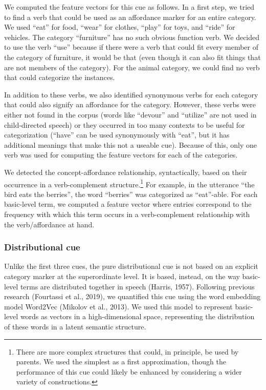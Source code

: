 \documentclass[english,,man,floatsintext]{apa6}
\let\rmarkdownfootnote\footnote%
\def\footnote{\protect\rmarkdownfootnote}
\begin{document}
We computed the feature vectors for this cue as follows. In a first step, we tried to find a verb that could be used as an affordance marker for an entire category. We used \enquote{eat} for food, \enquote{wear} for clothes, \enquote{play} for toys, and \enquote{ride} for vehicles. The category \enquote{furniture} has no such obvious function verb. We decided to use the verb \enquote{use} because if there were a verb that could fit every member of the category of furniture, it would be that (even though it can also fit things that are not members of the category). For the animal category, we could find no verb that could categorize the instances.

In addition to these verbs, we also identified synonymous verbs for each category that could also signify an affordance for the category. However, these verbs were either not found in the corpus (words like \enquote{devour} and \enquote{utilize} are not used in child-directed speech) or they occurred in too many contexts to be useful for categorization (\enquote{have} can be used synonymously with \enquote{eat}, but it has additional meanings that make this not a useable cue). Because of this, only one verb was used for computing the feature vectors for each of the categories.

We detected the concept-affordance relationship, syntactically, based on their occurrence in a verb-complement structure.\footnote{There are more complex structures that could, in principle, be used by parents. We used the simplest as a first approximation, though the performance of this cue could likely be enhanced by considering a wider variety of constructions.} For example, in the utterance \enquote{the bird eats the berries}, the word \enquote{berries} was categorized as \enquote{eat}-able. For each basic-level term, we computed a feature vector where entries correspond to the frequency with which this term occurs in a verb-complement relationship with the verb/affordance at hand.

\hypertarget{distributional-cue}{%
\subsubsection{Distributional cue}\label{distributional-cue}}

Unlike the first three cues, the pure distributional cue is not based on an explicit category marker at the superordinate level. It is based,
instead, on the way basic-level terms are distributed together in speech (Harris, 1957). Following previous research (Fourtassi et al., 2019), we quantified this cue using the word embedding model Word2Vec (Mikolov et al., 2013). We used this model to represent basic-level words as vectors in a high-dimensional space, representing the distribution of these words in a latent semantic structure.
\end{document}
